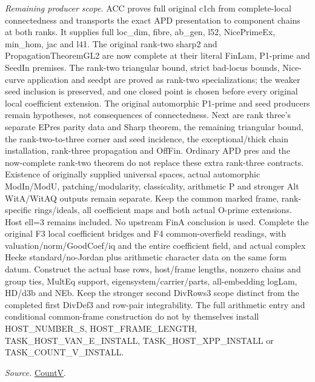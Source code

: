 \emph{Remaining producer scope.} ACC proves full original c1ch from complete-local connectedness and transports the exact APD presentation to component chains at both ranks. It supplies full loc\_\allowbreak dim, fibre, ab\_\allowbreak gen, l52, NicePrimeEx, min\_\allowbreak hom, jac and l41. The original rank-two sharp2 and PropagationTheoremGL2 are now complete at their literal FinLam, P1-prime and SeedIn premises. The rank-two triangular bound, strict bad-locus bounds, Nice-curve application and seedpt are proved as rank-two specializations; the weaker seed inclusion is preserved, and one closed point is chosen before every original local coefficient extension. The original automorphic P1-prime and seed producers remain hypotheses, not consequences of connectedness. Next are rank three's separate EPres parity data and Sharp theorem, the remaining triangular bound, the rank-two-to-three corner and seed incidence, the exceptional/thick chain installation, rank-three propagation and OffFin. Ordinary APD pres and the now-complete rank-two theorem do not replace these extra rank-three contracts. Existence of originally supplied universal spaces, actual automorphic ModIn/ModU, patching/modularity, classicality, arithmetic P and stronger Alt WitA/WitAQ outputs remain separate. Keep the common marked frame, rank-specific rings/ideals, all coefficient maps and both actual O-prime extensions. Host ell=3 remains included. No upstream FinA conclusion is used. Complete the original F3 local coefficient bridges and F4 common-overfield readings, with valuation/norm/GoodCoef/iq and the entire coefficient field, and actual complex Hecke standard/no-Jordan plus arithmetic character data on the same form datum. Construct the actual base rows, host/frame lengths, nonzero chains and group ties, MultEq support, eigensystem/carrier/parts, all-embedding logLam, HD/d3b and NEb. Keep the stronger second DivRows3 scope distinct from the completed first DivDef3 and row-pair integrability. The full arithmetic entry and conditional common-frame construction do not by themselves install HOST\_\allowbreak NUMBER\_\allowbreak S, HOST\_\allowbreak FRAME\_\allowbreak LENGTH, TASK\_\allowbreak HOST\_\allowbreak VAN\_\allowbreak E\_\allowbreak INSTALL, TASK\_\allowbreak HOST\_\allowbreak XPP\_\allowbreak INSTALL or TASK\_\allowbreak COUNT\_\allowbreak V\_\allowbreak INSTALL.

\emph{Source.} \href{https://github.com/CocoSgt/riemann-hypothesis-lean/blob/7cbf7a0c32fca1badf05931879a37c3f8a2b03b4/src/Development/AutomorphicArithmetic/AutomorphicVarieties/HeightAndVanishing/Counts.lean#L69-L69}{CountV}.

